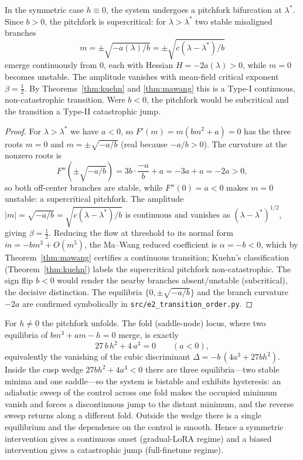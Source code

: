 \begin{theorem}\label{thm:pitchfork}
In the symmetric case $h\equiv0$, the system undergoes a pitchfork bifurcation at
$\lambda^\ast$. Since $b>0$, the pitchfork is supercritical: for $\lambda>\lambda^\ast$ two
stable misaligned branches
\[
   m=\pm\sqrt{-a(\lambda)/b}=\pm\sqrt{c(\lambda-\lambda^\ast)/b}
\]
emerge continuously from $0$, each with Hessian $H=-2a(\lambda)>0$, while $m=0$ becomes
unstable. The amplitude vanishes with mean-field critical exponent $\beta=\tfrac12$. By
Theorems~\ref{thm:kuehn} and \ref{thm:mawang} this is a Type-I continuous, non-catastrophic
transition. Were $b<0$, the pitchfork would be subcritical and the transition a Type-II
catastrophic jump.
\end{theorem}

\begin{proof}
For $\lambda>\lambda^\ast$ we have $a<0$, so $F'(m)=m(bm^2+a)=0$ has the three roots $m=0$ and
$m=\pm\sqrt{-a/b}$ (real because $-a/b>0$). The curvature at the nonzero roots is
\[
   F''\!\left(\pm\sqrt{-a/b}\right)=3b\cdot\frac{-a}{b}+a=-3a+a=-2a>0,
\]
so both off-center branches are stable, while $F''(0)=a<0$ makes $m=0$ unstable: a supercritical
pitchfork. The amplitude $|m|=\sqrt{-a/b}=\sqrt{c(\lambda-\lambda^\ast)/b}$ is continuous and
vanishes as $(\lambda-\lambda^\ast)^{1/2}$, giving $\beta=\tfrac12$. Reducing the flow at
threshold to its normal form $\dot m=-bm^3+O(m^5)$, the Ma--Wang reduced coefficient is
$\alpha=-b<0$, which by Theorem~\ref{thm:mawang} certifies a continuous transition; Kuehn's
classification (Theorem~\ref{thm:kuehn}) labels the supercritical pitchfork non-catastrophic.
The sign flip $b<0$ would render the nearby branches absent/unstable (subcritical), the decisive
distinction. The equilibria $\{0,\pm\sqrt{-a/b}\}$ and the branch curvature $-2a$ are confirmed
symbolically in \texttt{src/e2\_transition\_order.py}.
\end{proof}

\begin{theorem}\label{thm:fold}
For $h\neq0$ the pitchfork unfolds. The fold (saddle-node) locus, where two equilibria of
$bm^3+am-h=0$ merge, is exactly
\begin{equation}\label{eq:cuspcurve}
   27\,b\,h^2+4\,a^3=0\qquad(a<0),
\end{equation}
equivalently the vanishing of the cubic discriminant $\Delta=-b\,(4a^3+27bh^2)$. Inside the
cusp wedge $27bh^2+4a^3<0$ there are three equilibria---two stable minima and one saddle---so
the system is bistable and exhibits hysteresis: an adiabatic sweep of the control across one
fold makes the occupied minimum vanish and forces a discontinuous jump to the distant minimum,
and the reverse sweep returns along a different fold. Outside the wedge there is a single
equilibrium and the dependence on the control is smooth. Hence a symmetric intervention gives a
continuous onset (gradual-LoRA regime) and a biased intervention gives a catastrophic jump
(full-finetune regime).
\end{theorem}

